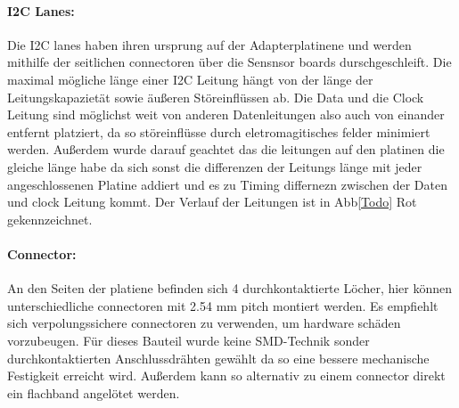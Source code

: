 \paragraph{I2C Lanes:}
Die I2C lanes haben ihren ursprung auf der Adapterplatinene und werden mithilfe der seitlichen connectoren über die Sensnsor boards durschgeschleift.
Die maximal mögliche länge einer I2C Leitung hängt von der länge der Leitungskapazietät sowie äußeren Störeinflüssen ab.
Die Data und die Clock Leitung sind möglichst weit von anderen Datenleitungen  also auch von einander entfernt platziert, da so störeinflüsse durch eletromagitisches felder minimiert werden.
Außerdem wurde darauf geachtet das die leitungen auf den platinen die gleiche länge habe da sich sonst die differenzen der Leitungs länge mit jeder angeschlossenen Platine addiert und es zu Timing differnezn zwischen der Daten und clock Leitung kommt.
Der Verlauf der Leitungen ist in Abb\ref{Todo} Rot gekennzeichnet.

\paragraph{Connector:} An den Seiten der platiene befinden sich 4 durchkontaktierte Löcher, hier können unterschiedliche connectoren mit 2.54 mm pitch montiert werden.
	Es empfiehlt sich verpolungssichere connectoren zu verwenden, um hardware schäden vorzubeugen.
	Für dieses Bauteil wurde  keine SMD-Technik sonder durchkontaktierten Anschlussdrähten gewählt da so eine bessere mechanische Festigkeit erreicht wird.
Außerdem kann so alternativ zu einem connector direkt ein flachband angelötet werden.

